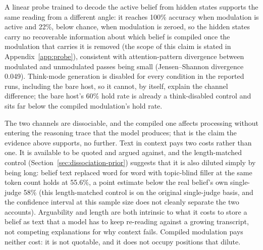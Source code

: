 
A linear probe trained to decode the active belief from hidden states supports the same
reading from a different angle: it reaches 100\% accuracy when modulation is active and
22\%, below chance, when modulation is zeroed, so the hidden states carry no recoverable
information about which belief is compiled once the modulation that carries it is removed
(the scope of this claim is stated in Appendix~\ref{app:probe}), consistent with
attention-pattern divergence between modulated and unmodulated passes being small
(Jensen--Shannon divergence 0.049). Think-mode generation is disabled for every
condition in the reported runs, including the bare host, so it cannot, by itself,
explain the channel difference; the bare host's 60\% hold rate is already a
think-disabled control and sits far below the compiled modulation's hold rate.

The two channels are dissociable, and the compiled one affects processing without
entering the reasoning trace that the model produces; that is the claim the evidence
above supports, no further. Text in context pays two costs rather than one. It is
available to be quoted and argued against, and the length-matched control
(Section~\ref{sec:dissociation-prior}) suggests that it is also diluted simply by being
long: belief text replaced word for word with topic-blind filler at the same token count
holds at 55.6\%, a point estimate below the real belief's own single-judge 58\% (this
length-matched control is on the original single-judge basis, and the confidence
interval at this sample size does not cleanly separate the two accounts). Arguability and
length are both intrinsic to what it costs to store a belief as text that a model has to
keep re-reading against a growing transcript, not competing explanations for why context
fails. Compiled modulation pays neither cost: it is not quotable, and it does not occupy
positions that dilute.
